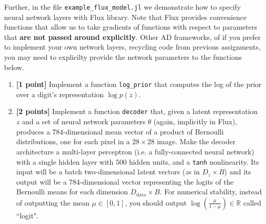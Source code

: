 \documentclass{article}
\begin{document}
Further, in the file \texttt{example\_flux\_model.jl} we demonstrate how to specify neural network layers with Flux library.
Note that Flux provides convenience functions that allow us to take gradients of functions with respect to parameters that \textbf{are not passed around explicitly}.
Other AD frameworks, of if you prefer to implement your own network layers, recycling code from previous assignments, you may need to explicilty provide the network parameters to the functions below.

\begin{enumerate}[label=(\alph*)]
	
  \item {\bf [1 point]} Implement a function \texttt{log\_prior} that computes the log of the prior over a digit's representation $\log p(z)$.
	
  \item {\bf [2 points]} Implement a function \texttt{decoder} that, given a latent representation $z$ and a set of neural network parameters $\theta$ (again, implicitly in Flux), produces a 784-dimensional mean vector of a product of Bernoulli distributions, one for each pixel in a $28 \times 28$ image.
	Make the decoder architecture a multi-layer perceptron (i.e. a fully-connected neural network) with a single hidden layer with $500$ hidden units, and a \texttt{tanh} nonlinearity.
  Its input will be a batch two-dimensional latent vectors ($z$s in $D_z \times B$) and its output will be a 784-dimensional vector representing the logits of the Bernoulli means for each dimension $D_\text{data}\times B$.
	For numerical stability, instead of outputting the mean $\mu \in [0,1]$, you should output $\log \left( \frac{\mu}{1 - \mu} \right) \in \mathbb{R}$ called ``logit".
	
	

\end{enumerate}
\end{document}

